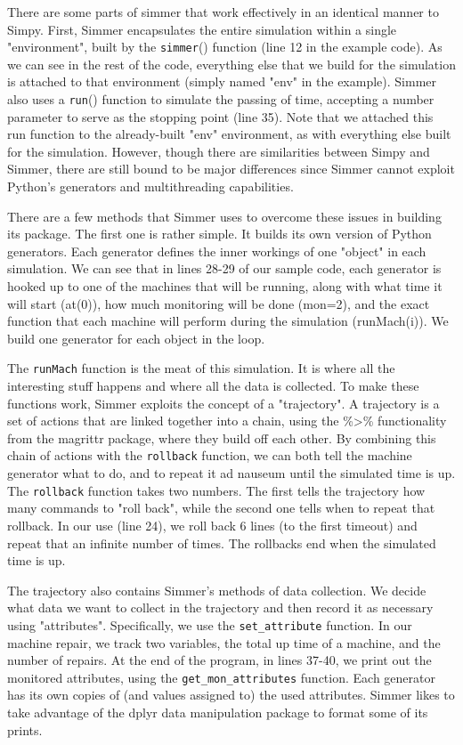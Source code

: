 \documentclass[a4paper, 11pt]{article} %
\begin{document}
There are some parts of simmer that work effectively in an identical manner to Simpy. First, Simmer encapsulates the entire simulation within a single "environment", built by the \texttt{simmer}() function (line 12 in the example code). As we can see in the rest of the code, everything else that we build for the simulation is attached to that environment (simply named "env" in the example). Simmer also uses a \texttt{run}() function to simulate the passing of time, accepting a number parameter to serve as the stopping point (line 35). Note that we attached this run function to the already-built "env" environment, as with everything else built for the simulation. However, though there are similarities between Simpy and Simmer, there are still bound to be major differences since Simmer cannot exploit Python's generators and multithreading capabilities.

There are a few methods that Simmer uses to overcome these issues in building its package. The first one is rather simple. It builds its own version of Python generators. Each generator defines the inner workings of one "object" in each simulation. We can see that in lines 28-29 of our sample code, each generator is hooked up to one of the machines that will be running, along with what time it will start (at(0)), how much monitoring will be done (mon=2), and the exact function that each machine will perform during the simulation (runMach(i)). We build one generator for each object in the loop. \pagebreak

The \texttt{runMach} function is the meat of this simulation. It is where all the interesting stuff happens and where all the data is collected. To make these functions work, Simmer exploits the concept of a "trajectory". A trajectory is a set of actions that are linked together into a chain, using the \%>\% functionality from the magrittr package, where they build off each other. By combining this chain of actions with the \texttt{rollback} function, we can both tell the machine generator what to do, and to repeat it ad nauseum until the simulated time is up. The \texttt{rollback} function takes two numbers. The first tells the trajectory how many commands to "roll back", while the second one tells when to repeat that rollback. In our use (line 24), we roll back 6 lines (to the first timeout) and repeat that an infinite number of times. The rollbacks end when the simulated time is up.


The trajectory also contains Simmer's methods of data collection. We decide what data we want to collect in the trajectory and then record it as necessary using "attributes". Specifically, we use the \texttt{set\_attribute} function. In our machine repair, we track two variables, the total up time of a machine, and the number of repairs. At the end of the program, in lines 37-40, we print out the monitored attributes, using the \texttt{get\_mon\_attributes} function. Each generator has its own copies of (and values assigned to) the used attributes. Simmer likes to take advantage of the dplyr data manipulation package to format some of its prints.
\end{document}
